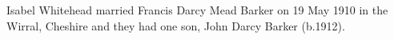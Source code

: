 
Isabel Whitehead married  Francis Darcy Mead Barker on 19 May 1910 in the Wirral, Cheshire and they had one son, John Darcy Barker (b.1912).
